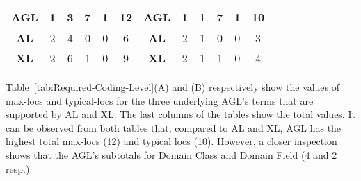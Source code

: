 \begin{table}[ht]
\begin{tabular}{|c|cccc|c|cccc|c|c|}
	\textbf{AGL} & \multicolumn{1}{c|}{1}                                                       & \multicolumn{1}{c|}{3}                                                      & \multicolumn{1}{c|}{7}                                                            & 1                                                                  & 12                      & \multicolumn{1}{c|}{\textbf{AGL}} & \multicolumn{1}{c|}{1}                                                       & \multicolumn{1}{c|}{1}                                                       & 7                                                            & 1                                                                  & 10                      \\ \hline
	\textbf{AL}  & \multicolumn{1}{c|}{2}                                                       & \multicolumn{1}{c|}{4}                                                      & \multicolumn{1}{c|}{0}                                                            & 0                                                                  & 6                       & \multicolumn{1}{c|}{\textbf{AL}}  & \multicolumn{1}{c|}{2}                                                       & \multicolumn{1}{c|}{1}                                                       & 0                                                            & 0                                                                  & 3                       \\ \hline
	\textbf{XL}  & \multicolumn{1}{c|}{2}                                                       & \multicolumn{1}{c|}{6}                                                      & \multicolumn{1}{c|}{1}                                                            & 0                                                                  & 9                       & \multicolumn{1}{c|}{\textbf{XL}}  & \multicolumn{1}{c|}{2}                                                       & \multicolumn{1}{c|}{1}                                                       & 1                                                            & 0                                                                  & 4
	                       \\ \hline
\end{tabular}
\end{table}
%
Table~\ref{tab:Required-Coding-Level}(A) and (B) respectively show the values of max-locs and typical-locs for the three underlying AGL’s terms that are supported by AL and XL. The last columns of the tables show the total values. It can be observed from both tables that, compared to AL and XL, AGL has the highest total max-locs (12) and typical locs (10). However, a closer inspection shows that the AGL’s subtotals for Domain Class and Domain Field (4 and 2 resp.)
